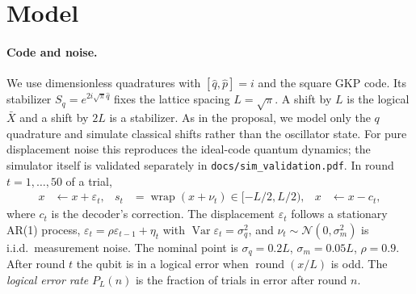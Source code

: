\section{Model}\label{sec:model}

\paragraph{Code and noise.}
We use dimensionless quadratures with $[\hat q,\hat p]=i$ and the square GKP
code. Its stabilizer $S_q=e^{2i\sqrt\pi\hat q}$ fixes the lattice spacing
$L=\sqrt\pi$. A shift by $L$ is the logical $\bar X$ and a shift by $2L$ is a
stabilizer. As in the proposal, we model only the $q$ quadrature and simulate
classical shifts rather than the oscillator state. For pure displacement
noise this reproduces the ideal-code quantum dynamics; the simulator itself is
validated separately in \texttt{docs/sim\_validation.pdf}.
In round $t=1,\dots,50$ of a trial,
\begin{align*}
  x &\leftarrow x+\varepsilon_t, &
  s_t &= \operatorname{wrap}(x+\nu_t)\in[-L/2,L/2), &
  x &\leftarrow x-c_t,
\end{align*}
where $c_t$ is the decoder's correction. The displacement
$\varepsilon_t$ follows a stationary AR(1) process,
$\varepsilon_t=\rho\varepsilon_{t-1}+\eta_t$ with
$\operatorname{Var}\varepsilon_t=\sigma_q^2$, and $\nu_t\sim\mathcal N(0,\sigma_m^2)$
is i.i.d.\ measurement noise. The nominal point is $\sigma_q=0.2L$,
$\sigma_m=0.05L$, $\rho=0.9$. After round $t$ the qubit is in a logical error
when $\operatorname{round}(x/L)$ is odd. The \emph{logical error rate}
$P_L(n)$ is the fraction of trials in error after round $n$.

